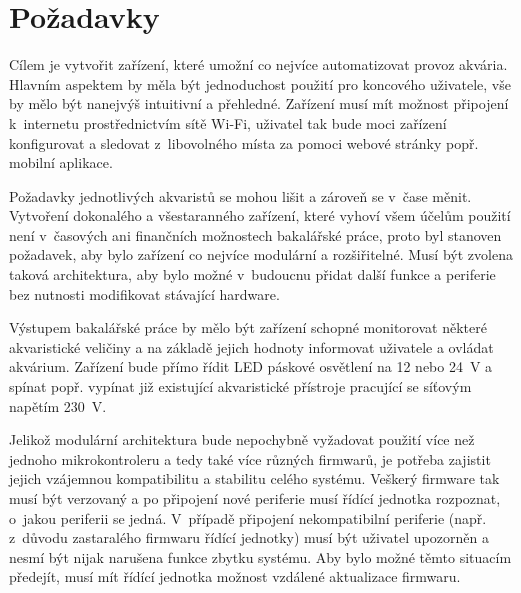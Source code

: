 \section{Požadavky}
\label{sec:pozadavky}
    Cílem je vytvořit zařízení, které umožní co nejvíce automatizovat provoz akvária. Hlavním aspektem by měla být jednoduchost použití pro koncového uživatele, vše by mělo být nanejvýš intuitivní a přehledné. Zařízení musí mít možnost připojení k~internetu prostřednictvím sítě Wi-Fi, uživatel tak bude moci zařízení konfigurovat a sledovat z~libovolného místa za pomoci webové stránky popř. mobilní aplikace.

    Požadavky jednotlivých akvaristů se mohou lišit a zároveň se v~čase měnit. Vytvoření dokonalého a všestaranného zařízení, které vyhoví všem účelům použití není v~časových ani finančních možnostech bakalářské práce, proto byl stanoven požadavek, aby bylo zařízení co nejvíce modulární a rozšiřitelné. Musí být zvolena taková architektura, aby bylo možné v~budoucnu přidat další funkce a periferie bez nutnosti modifikovat stávající hardware.

    Výstupem bakalářské práce by mělo být zařízení schopné monitorovat některé akvaristické veličiny a na základě jejich hodnoty informovat uživatele a ovládat akvárium. Zařízení bude přímo řídit LED páskové osvětlení na 12 nebo \qty{24}{V} a spínat popř. vypínat již existující akvaristické přístroje pracující se síťovým napětím \qty{230}{V}.  

    Jelikož modulární architektura bude nepochybně vyžadovat použití více než jednoho mikrokontroleru a tedy také více různých firmwarů, je potřeba zajistit jejich vzájemnou kompatibilitu a stabilitu celého systému. Veškerý firmware tak musí být verzovaný a po připojení nové periferie musí řídící jednotka rozpoznat, o~jakou periferii se jedná. V~případě připojení nekompatibilní periferie (např. z~důvodu zastaralého firmwaru řídící jednotky) musí být uživatel upozorněn a nesmí být nijak narušena funkce zbytku systému. Aby bylo možné těmto situacím předejít, musí mít řídící jednotka možnost vzdálené aktualizace firmwaru.